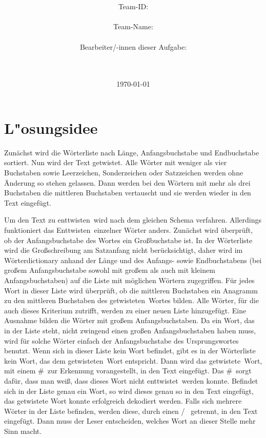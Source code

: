 \documentclass[a4paper,10pt,ngerman]{scrartcl}
\title{\textbf{\Huge\Aufgabe}}
\author{\LARGE Team-ID: \LARGE \TeamID \\\\
	    \LARGE Team-Name: \LARGE \TeamName \\\\
	    \LARGE Bearbeiter/-innen dieser Aufgabe: \\ 
	    \LARGE \Namen\\\\}
\date{\LARGE\today}
\begin{document}
\maketitle
\tableofcontents

\section{L"osungsidee}
Zunächst wird die Wörterliste nach Länge, Anfangsbuchstabe und Endbuchstabe sortiert.
Nun wird der Text \glqq getwistet\grqq.
Alle Wörter mit weniger als vier Buchstaben sowie Leerzeichen, Sonderzeichen oder Satzzeichen werden ohne Änderung so stehen gelassen. Dann werden bei den Wörtern mit mehr als drei Buchstaben die mittleren Buchstaben vertauscht und sie werden wieder in den Text eingefügt.

Um den Text zu \glqq enttwisten\grqq\ wird nach dem gleichen Schema verfahren. Allerdings funktioniert das \glqq Enttwisten\grqq\ einzelner Wörter anders. Zunächst wird überprüft, ob der Anfangsbuchstabe des Wortes ein Großbuchstabe ist. In der Wörterliste wird die Großschreibung am Satzanfang nicht berücksichtigt, daher wird im Wörterdictionary anhand der Länge und des Anfangs- sowie Endbuchstabens (bei großem Anfangsbuchstabe sowohl mit großem als auch mit kleinem Anfangsbuchstaben) auf die Liste mit möglichen Wörtern zugegriffen. Für jedes Wort in dieser Liste wird überprüft, ob die mittleren Buchstaben ein Anagramm zu den mittleren Buchstaben des \glqq getwisteten\grqq\ Wortes bilden. Alle Wörter, für die auch dieses Kriterium zutrifft, werden zu einer neuen Liste hinzugefügt. Eine Ausnahme bilden die Wörter mit großem Anfangsbuchstaben. Da ein Wort, das in der Liste steht, nicht zwingend einen großen Anfangsbuchstaben haben muss, wird für solche Wörter einfach der Anfangsbuchstabe des Ursprungswortes benutzt.
Wenn sich in dieser Liste kein Wort befindet, gibt es in der Wörterliste kein Wort, das dem \glqq getwisteten\grqq\ Wort entspricht. Dann wird das \glqq getwistete\grqq\ Wort, mit einem \glqq\#\grqq\ zur Erkennung vorangestellt, in den Text eingefügt. Das \glqq \#\grqq\ sorgt dafür, dass man weiß, dass dieses Wort nicht \glqq enttwistet\grqq\ werden konnte.
Befindet sich in der Liste genau ein Wort, so wird dieses genau so in den Text eingefügt, das getwistete Wort konnte erfolgreich dekodiert werden.
Falls sich mehrere Wörter in der Liste befinden, werden diese, durch einen \glqq / \grqq\ getrennt, in den Text eingefügt. Dann muss der Leser entscheiden, welches Wort an dieser Stelle mehr Sinn macht.
\end{document}
